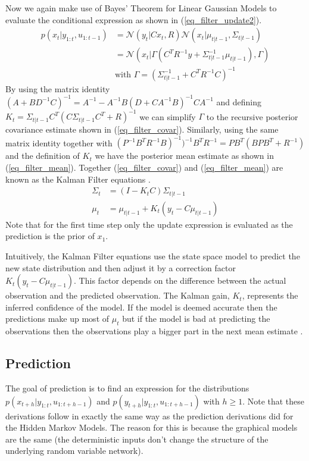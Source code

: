 \documentclass[../masters.tex]{subfiles}
\begin{document}
Now we again make use of Bayes' Theorem for Linear Gaussian Models to evaluate the conditional expression as shown in (\ref{eq_filter_update2}).
\begin{equation}
\begin{aligned}
p(x_t|y_{1:t},u_{1:t-1}) &=\mathcal{N}(y_{t}|Cx_{t}, R)\mathcal{N}(x_t|\mu_{t|t-1},\Sigma_{t|t-1})\\ 
&= \mathcal{N}(x_t|\Gamma(C^TR^{-1}y + \Sigma_{t|t-1}^{-1}\mu_{t|t-1}), \Gamma) \\
&\text{with } \Gamma = (\Sigma_{t|t-1}^{-1}+C^TR^{-1}C)^{-1} 
\end{aligned}
\label{eq_filter_update2}
\end{equation} 
By using the matrix identity $(A+BD^{-1}C)^{-1}=A^{-1}-A^{-1}B(D+CA^{-1}B)^{-1}CA^{-1}$ and defining $K_t = \Sigma_{t|t-1}C^T(C\Sigma_{t|t-1}C^T+R)^{-1}$ we can simplify $\Gamma$ to the recursive posterior covariance estimate shown in (\ref{eq_filter_covar}). Similarly, using the same matrix identity together with $(P^{-1} B^TR^{-1}B)^{-1})^{-1}B^TR^{-1} = PB^T(BPB^T+R^{-1})$ and the definition of $K_t$ we have the posterior mean estimate as shown in (\ref{eq_filter_mean}). Together (\ref{eq_filter_covar}) and (\ref{eq_filter_mean}) are known as the Kalman Filter equations \cite{murphy2}.
\begin{align}
\Sigma_t &= (I-K_tC)\Sigma_{t|t-1} 
\label{eq_filter_covar} \\
\mu_t &= \mu_{t|t-1} + K_t(y_t - C\mu_{t|t-1})
\label{eq_filter_mean}
\end{align}
Note that for the first time step only the update expression is evaluated as the prediction is the prior of $x_1$. 

Intuitively, the Kalman Filter equations use the state space model to predict the new state distribution and then adjust it by a correction factor $K_t(y_t - C\mu_{t|t-1})$. This factor depends on the difference between the actual observation and the predicted observation. The Kalman gain, $K_t$, represents the inferred confidence of the model. If the model is deemed accurate then the predictions make up most of $\mu_t$ but if the model is bad at predicting the observations then the observations play a bigger part in the next mean estimate \cite{bishop}. 

\subsection{Prediction}
The goal of prediction is to find an expression for the distributions $p(x_{t+h}|y_{1:t}, u_{1:t+h-1})$ and $p(y_{t+h}|y_{1:t}, u_{1:t+h-1})$ with $h\geq 1$. Note that these derivations follow in exactly the same way as the prediction derivations did for the Hidden Markov Models. The reason for this is because the graphical models are the same (the deterministic inputs don't change the structure of the underlying random variable network). 
\end{document}
